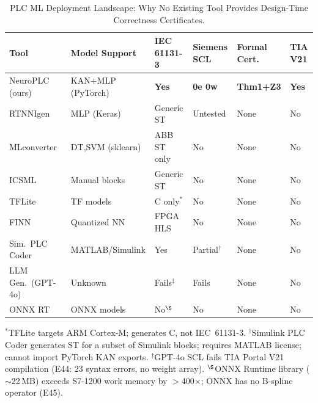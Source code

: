 \begin{table}[t]
\centering
\caption{PLC ML Deployment Landscape: Why No Existing Tool Provides Design-Time Correctness Certificates.}
\label{tab:full_landscape}
\footnotesize
\begin{tabular}{@{}p{1.5cm}p{1.6cm}p{1.5cm}p{1.4cm}p{1.3cm}p{1.2cm}@{}}
\toprule
\textbf{Tool} & \textbf{Model Support} & \textbf{IEC 61131-3} & \textbf{Siemens SCL} & \textbf{Formal Cert.} & \textbf{TIA V21} \\
\midrule
NeuroPLC (ours) & KAN+MLP (PyTorch) & \textbf{Yes} & \textbf{0e 0w} & \textbf{Thm1+Z3} & \textbf{Yes} \\
RTNNIgen~\cite{rtnnigen2024} & MLP (Keras) & Generic ST & Untested & None & No \\
MLconverter~\cite{mlconverter2025} & DT,SVM (sklearn) & ABB ST only & No & None & No \\
ICSML~\cite{icsml2023} & Manual blocks & Generic ST & No & None & No \\
TFLite~\cite{tensorflow2015} & TF models & C only$^{*}$ & No & None & No \\
FINN~\cite{blott2018finn} & Quantized NN & FPGA HLS & No & None & No \\
Sim.\ PLC Coder & MATLAB/Simulink & Yes & Partial$^{\dag}$ & None & No \\
LLM Gen.\ (GPT-4o) & Unknown & Fails$^{\ddag}$ & Fails & None & No \\
ONNX RT~\cite{onnxruntime} & ONNX models & No$^{\S}$ & No & None & No \\
\bottomrule
\end{tabular}
\vspace{2pt}
{\scriptsize $^{*}$TFLite targets ARM Cortex-M; generates C, not IEC~61131-3. $^{\dag}$Simulink PLC Coder generates ST for a subset of Simulink blocks; requires MATLAB license; cannot import PyTorch KAN exports. $^{\ddag}$GPT-4o SCL fails TIA Portal V21 compilation (E44: 23 syntax errors, no weight array). $^{\S}$ONNX Runtime library ($\sim$22\,MB) exceeds S7-1200 work memory by $>$400$\times$; ONNX has no B-spline operator (E45).}
\end{table}
